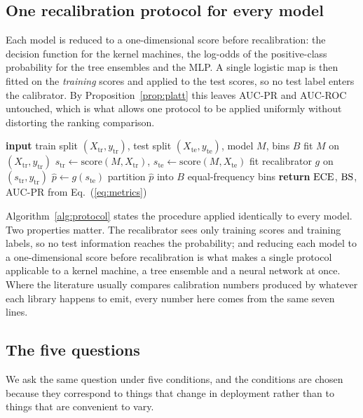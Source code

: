 \documentclass[journal]{IEEEtran}
\begin{document}
\subsection{One recalibration protocol for every model}
Each model is reduced to a one-dimensional score before recalibration: the
decision function for the kernel machines, the log-odds of the
positive-class probability for the tree ensembles and the MLP. A single
logistic map is then fitted on the \emph{training} scores and applied to the
test scores, so no test label enters the calibrator. By
Proposition~\ref{prop:platt} this leaves AUC-PR and AUC-ROC untouched, which
is what allows one protocol to be applied uniformly without distorting the
ranking comparison.

\begin{algorithm}[t]
\caption{Uniform probability and reliability protocol}
\label{alg:protocol}
\begin{algorithmic}[1]
\STATE \textbf{input} train split $(X_{\mathrm{tr}},y_{\mathrm{tr}})$, test
       split $(X_{\mathrm{te}},y_{\mathrm{te}})$, model $M$, bins $B$
\STATE fit $M$ on $(X_{\mathrm{tr}},y_{\mathrm{tr}})$
\STATE $s_{\mathrm{tr}} \leftarrow \mathrm{score}(M,X_{\mathrm{tr}})$,\;
       $s_{\mathrm{te}} \leftarrow \mathrm{score}(M,X_{\mathrm{te}})$
\STATE fit recalibrator $g$ on $(s_{\mathrm{tr}},y_{\mathrm{tr}})$
\STATE $\hat p \leftarrow g(s_{\mathrm{te}})$
\STATE partition $\hat p$ into $B$ equal-frequency bins
\STATE \textbf{return} $\mathrm{ECE}$, $\mathrm{BS}$, AUC-PR from
       Eq.~(\ref{eq:metrics})
\end{algorithmic}
\end{algorithm}

Algorithm~\ref{alg:protocol} states the procedure applied identically to
every model. Two properties matter. The recalibrator sees only training
scores and training labels, so no test information reaches the probability;
and reducing each model to a one-dimensional score before recalibration is
what makes a single protocol applicable to a kernel machine, a tree ensemble
and a neural network at once. Where the literature usually compares
calibration numbers produced by whatever each library happens to emit, every
number here comes from the same seven lines.

\subsection{The five questions}
We ask the same question under five conditions, and the conditions are
chosen because they correspond to things that change in deployment rather
than to things that are convenient to vary.
\end{document}
